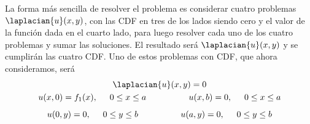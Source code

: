 La forma más sencilla de resolver el problema es considerar cuatro problemas $\laplacian{u}(x, y)$, con las CDF en tres de los lados siendo cero y el valor de la función dada en el cuarto lado, para luego resolver cada uno de los cuatro problemas y sumar las soluciones. El resultado será $\laplacian{u}(x, y)$ y se cumplirán las cuatro CDF. Uno de estos problemas con CDF, que ahora consideramos, será
\begin{align*}
\begin{gathered}
\laplacian{u}(x, y) = 0 \\
u(x, 0) = f_{1} (x), \hspace{0.5cm} 0 \leq x \leq a \hspace{1.75cm} u(x, b) = 0, \hspace{0.5cm} 0 \leq x \leq a \\[0.5em]
u(0, y) = 0, \hspace{0.5cm} 0 \leq y \leq b \hspace{1.75cm} u(a, y) = 0, \hspace{0.5cm} 0 \leq y \leq b
\end{gathered}
\end{align*}
